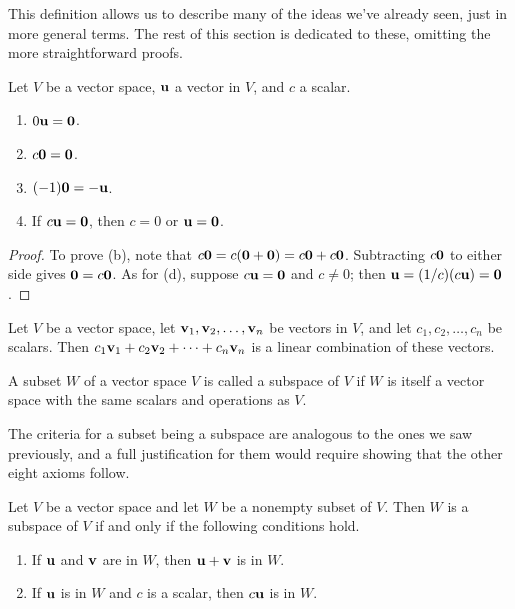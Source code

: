 \documentclass[../m073main.tex]{subfiles}
\begin{document}
This definition allows us to describe many of the ideas we've already seen, just in more general terms.
The rest of this section is dedicated to these, omitting the more straightforward proofs.

\begin{theorem}
	Let $V$ be a vector space, $\mathbf{u}$ a vector in $V$, and $c$ a scalar.
	\begin{multicols}{2}
		\begin{enumerate}[label=(\alph*)]
			\item $0 \mathbf{u} = \mathbf{0}$.
			\item $c \mathbf{0} = \mathbf{0}$.
			\item $(-1) \mathbf{0} = -\mathbf{u}$.
			\item If $c \mathbf{u} = \mathbf{0}$, then $c = 0$ or $\mathbf{u} = \mathbf{0}$.
		\end{enumerate}
	\end{multicols}
\end{theorem}

\begin{proof}
	To prove (b), note that $c \mathbf{0} = c (\mathbf{0} + \mathbf{0}) = c \mathbf{0} + c \mathbf{0}$.
	Subtracting $c \mathbf{0}$ to either side gives $\mathbf{0} = c \mathbf{0}$.
	As for (d), suppose $c \mathbf{u} = \mathbf{0}$ and $c \neq 0$; then $\mathbf{u} = (1 / c) (c \mathbf{u}) = \mathbf{0}$.
\end{proof}

\begin{definition}
	Let $V$ be a vector space, let $\mathbf{v}_1, \mathbf{v}_2, \ldots, \mathbf{v}_n$ be vectors in $V$, and let $c_1, c_2, \ldots, c_n$ be scalars.
	Then $c_1\mathbf{v}_1 + c_2\mathbf{v}_2 + \cdots + c_n \mathbf{v}_n$ is a linear combination of these vectors.
\end{definition}

\begin{definition}[Subspace]
	A subset $W$ of a vector space $V$ is called a subspace of $V$ if $W$ is itself a vector space with the same scalars and operations as $V$.
\end{definition}

The criteria for a subset being a subspace are analogous to the ones we saw previously, and a full justification for them would require showing that the other eight axioms follow.

\begin{theorem}
	Let $V$ be a vector space and let $W$ be a nonempty subset of $V$.
	Then $W$ is a subspace of $V$ if and only if the following conditions hold.
	\begin{enumerate}[label=(\alph*)]
		\item If $\mathbf{u}$ and $\mathbf{v}$ are in $W$, then $\mathbf{u} + \mathbf{v}$ is in $W$.
		\item If $\mathbf{u}$ is in $W$ and $c$ is a scalar, then $c \mathbf{u}$ is in $W$.
	\end{enumerate}
\end{theorem}
\end{document}
